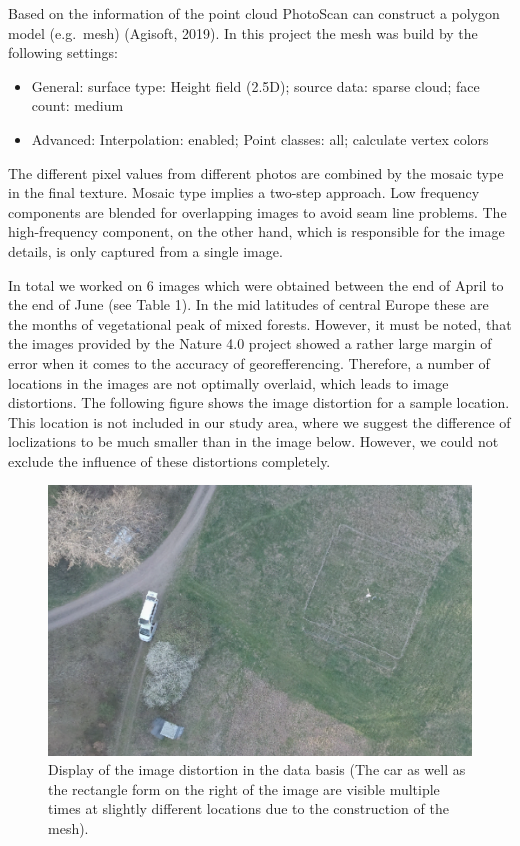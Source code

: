 \documentclass[]{article}
\begin{document}
Based on the information of the point cloud PhotoScan can construct a
polygon model (e.g.~mesh) (Agisoft, 2019). In this project the mesh was
build by the following settings:

\begin{itemize}
\item
  General: surface type: Height field (2.5D); source data: sparse cloud;
  face count: medium
\item
  Advanced: Interpolation: enabled; Point classes: all; calculate vertex
  colors
\end{itemize}

The different pixel values from different photos are combined by the
mosaic type in the final texture. Mosaic type implies a two-step
approach. Low frequency components are blended for overlapping images to
avoid seam line problems. The high-frequency component, on the other
hand, which is responsible for the image details, is only captured from
a single image.

In total we worked on 6 images which were obtained between the end of
April to the end of June (see Table 1). In the mid latitudes of central
Europe these are the months of vegetational peak of mixed forests.
However, it must be noted, that the images provided by the Nature 4.0
project showed a rather large margin of error when it comes to the
accuracy of georefferencing. Therefore, a number of locations in the
images are not optimally overlaid, which leads to image distortions. The
following figure shows the image distortion for a sample location. This
location is not included in our study area, where we suggest the
difference of loclizations to be much smaller than in the image below.
However, we could not exclude the influence of these distortions
completely.

\begin{figure}[H]

{\centering \includegraphics{report_files/figure-latex/Image distortion-1} 

}

\caption{Display of the image distortion in the data basis (The car as well as the rectangle form on the right of the image are visible multiple times at slightly different locations due to the construction of the mesh).}\label{fig:Image distortion}
\end{figure}
\end{document}
